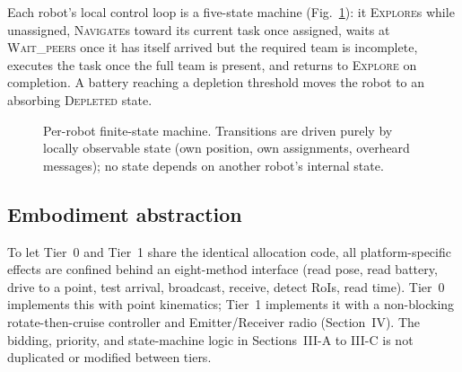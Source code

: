 \documentclass[conference]{IEEEtran}
\begin{document}
Each robot's local control loop is a five-state machine
(Fig.~\ref{fig:fsm}): it \textsc{Explore}s while unassigned,
\textsc{Navigate}s toward its current task once assigned, waits at
\textsc{Wait\_peers} once it has itself arrived but the required team is
incomplete, executes the task once the full team is present, and returns
to \textsc{Explore} on completion. A battery reaching a depletion
threshold moves the robot to an absorbing \textsc{Depleted} state.

\begin{figure}[t]
\centering
{}
\caption{Per-robot finite-state machine. Transitions are driven purely by
locally observable state (own position, own assignments, overheard
messages); no state depends on another robot's internal state.}
\label{fig:fsm}
\end{figure}

\subsection{Embodiment abstraction}

To let Tier~0 and Tier~1 share the identical allocation code, all
platform-specific effects are confined behind an eight-method interface
(read pose, read battery, drive to a point, test arrival, broadcast,
receive, detect RoIs, read time). Tier~0 implements this with point
kinematics; Tier~1 implements it with a non-blocking rotate-then-cruise
controller and Emitter/Receiver radio (Section~IV). The bidding,
priority, and state-machine logic in Sections~III-A to III-C is not
duplicated or modified between tiers.
\end{document}
